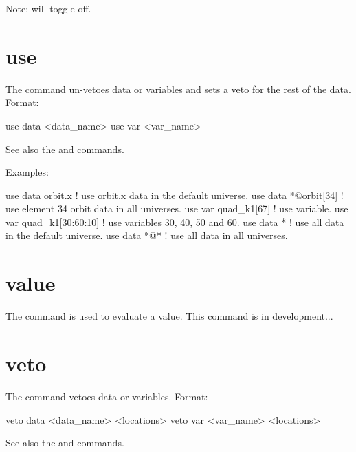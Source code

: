 {{{Note:  will toggle  off.

\section{use}
\label{s:use}

The  command un-vetoes data or variables and sets a veto for
the rest of the data. Format:
\begin{example}
  use data  <data_name>
  use var <var_name>
\end{example}

\vskip 0.2in 

See also the  and  commands.

Examples:
\begin{example}
  use data orbit.x             ! use orbit.x data in the default universe.
  use data *@orbit[34]         ! use element 34 orbit data in all universes.
  use var quad_k1[67]          ! use variable.
  use var quad_k1[30:60:10]    ! use variables 30, 40, 50 and 60.
  use data *                   ! use all data in the default universe.
  use data *@*                 ! use all data in all universes.
\end{example}


\section{value}
\label{s:value}

The  command is used to evaluate a value. 
This command is in development...

\section{veto}
\label{s:veto}

The  command vetoes data or variables. Format:
\begin{example}
  veto data <data_name> <locations>
  veto var <var_name> <locations>
\end{example}

\vskip 0.1in 

See also the  and  commands.

}}}
